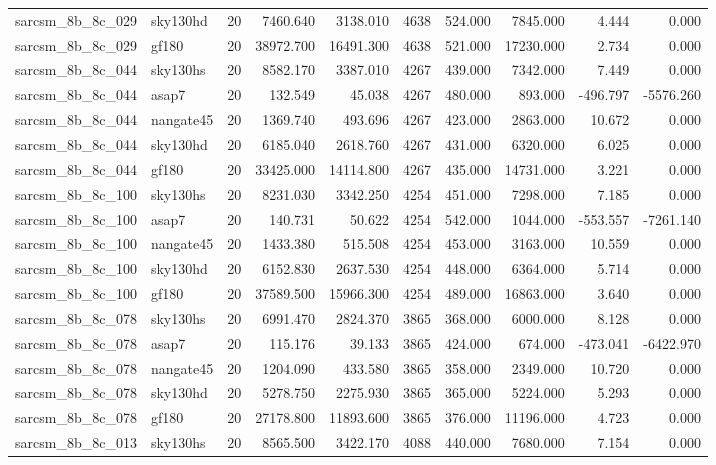 \documentclass{article}
\begin{document}
\begin{longtable}{llrrrrrrrr}
sarcsm\_8b\_8c\_029 & sky130hd & 20 & 7460.640 & 3138.010 & 4638 & 524.000 & 7845.000 & 4.444 & 0.000 \\
sarcsm\_8b\_8c\_029 & gf180 & 20 & 38972.700 & 16491.300 & 4638 & 521.000 & 17230.000 & 2.734 & 0.000 \\
sarcsm\_8b\_8c\_044 & sky130hs & 20 & 8582.170 & 3387.010 & 4267 & 439.000 & 7342.000 & 7.449 & 0.000 \\
sarcsm\_8b\_8c\_044 & asap7 & 20 & 132.549 & 45.038 & 4267 & 480.000 & 893.000 & -496.797 & -5576.260 \\
sarcsm\_8b\_8c\_044 & nangate45 & 20 & 1369.740 & 493.696 & 4267 & 423.000 & 2863.000 & 10.672 & 0.000 \\
sarcsm\_8b\_8c\_044 & sky130hd & 20 & 6185.040 & 2618.760 & 4267 & 431.000 & 6320.000 & 6.025 & 0.000 \\
sarcsm\_8b\_8c\_044 & gf180 & 20 & 33425.000 & 14114.800 & 4267 & 435.000 & 14731.000 & 3.221 & 0.000 \\
sarcsm\_8b\_8c\_100 & sky130hs & 20 & 8231.030 & 3342.250 & 4254 & 451.000 & 7298.000 & 7.185 & 0.000 \\
sarcsm\_8b\_8c\_100 & asap7 & 20 & 140.731 & 50.622 & 4254 & 542.000 & 1044.000 & -553.557 & -7261.140 \\
sarcsm\_8b\_8c\_100 & nangate45 & 20 & 1433.380 & 515.508 & 4254 & 453.000 & 3163.000 & 10.559 & 0.000 \\
sarcsm\_8b\_8c\_100 & sky130hd & 20 & 6152.830 & 2637.530 & 4254 & 448.000 & 6364.000 & 5.714 & 0.000 \\
sarcsm\_8b\_8c\_100 & gf180 & 20 & 37589.500 & 15966.300 & 4254 & 489.000 & 16863.000 & 3.640 & 0.000 \\
sarcsm\_8b\_8c\_078 & sky130hs & 20 & 6991.470 & 2824.370 & 3865 & 368.000 & 6000.000 & 8.128 & 0.000 \\
sarcsm\_8b\_8c\_078 & asap7 & 20 & 115.176 & 39.133 & 3865 & 424.000 & 674.000 & -473.041 & -6422.970 \\
sarcsm\_8b\_8c\_078 & nangate45 & 20 & 1204.090 & 433.580 & 3865 & 358.000 & 2349.000 & 10.720 & 0.000 \\
sarcsm\_8b\_8c\_078 & sky130hd & 20 & 5278.750 & 2275.930 & 3865 & 365.000 & 5224.000 & 5.293 & 0.000 \\
sarcsm\_8b\_8c\_078 & gf180 & 20 & 27178.800 & 11893.600 & 3865 & 376.000 & 11196.000 & 4.723 & 0.000 \\
sarcsm\_8b\_8c\_013 & sky130hs & 20 & 8565.500 & 3422.170 & 4088 & 440.000 & 7680.000 & 7.154 & 0.000 \\

\end{longtable}
\end{document}
